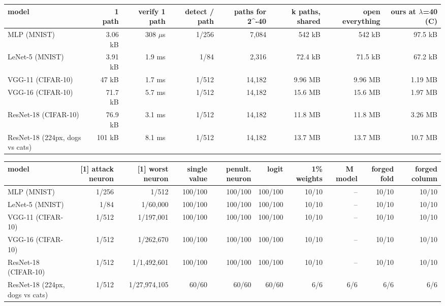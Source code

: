 \begin{tabular}{lrrrrrrr}
\toprule
model & 1 path & verify 1 path & detect / path & paths for 2^-40 & k paths, shared & open everything & ours at $\lambda$=40 (C) \\
\midrule
MLP (MNIST) & 3.06 kB & 308 $\mu$s & 1/256 & 7,084 & 542 kB & 542 kB & 97.5 kB \\
LeNet-5 (MNIST) & 3.91 kB & 1.9 ms & 1/84 & 2,316 & 72.4 kB & 71.5 kB & 67.2 kB \\
VGG-11 (CIFAR-10) & 47 kB & 1.7 ms & 1/512 & 14,182 & 9.96 MB & 9.96 MB & 1.19 MB \\
VGG-16 (CIFAR-10) & 71.7 kB & 5.7 ms & 1/512 & 14,182 & 15.6 MB & 15.6 MB & 1.97 MB \\
ResNet-18 (CIFAR-10) & 76.9 kB & 3.1 ms & 1/512 & 14,182 & 11.8 MB & 11.8 MB & 3.26 MB \\
ResNet-18 (224px, dogs vs cats) & 101 kB & 8.1 ms & 1/512 & 14,182 & 13.7 MB & 13.7 MB & 10.7 MB \\
\bottomrule
\end{tabular}

\begin{tabular}{lrrrrrrrrr}
\toprule
model & [1] attack neuron & [1] worst neuron & single value & penult. neuron & logit & 1\% weights & M~ model & forged fold & forged column \\
\midrule
MLP (MNIST) & 1/256 & 1/512 & 100/100 & 100/100 & 100/100 & 10/10 & – & 10/10 & 10/10 \\
LeNet-5 (MNIST) & 1/84 & 1/60,000 & 100/100 & 100/100 & 100/100 & 10/10 & – & 10/10 & 10/10 \\
VGG-11 (CIFAR-10) & 1/512 & 1/197,001 & 100/100 & 100/100 & 100/100 & 10/10 & – & 10/10 & 10/10 \\
VGG-16 (CIFAR-10) & 1/512 & 1/262,670 & 100/100 & 100/100 & 100/100 & 10/10 & – & 10/10 & 10/10 \\
ResNet-18 (CIFAR-10) & 1/512 & 1/1,492,601 & 100/100 & 100/100 & 100/100 & 10/10 & – & 10/10 & 10/10 \\
ResNet-18 (224px, dogs vs cats) & 1/512 & 1/27,974,105 & 60/60 & 60/60 & 60/60 & 6/6 & 6/6 & 6/6 & 6/6 \\
\bottomrule
\end{tabular}

